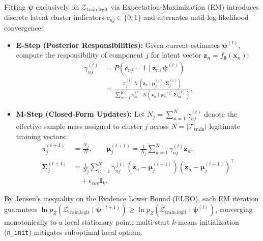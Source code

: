 Fitting $\boldsymbol{\psi}$ exclusively on $\mathcal{Z}_{\text{train,legit}}$ via Expectation-Maximization (EM) \cite{dempster1977maximum} introduces discrete latent cluster indicators $c_{nj} \in \{0,1\}$ and alternates until log-likelihood convergence:
\begin{itemize}
    \item \textbf{E-Step (Posterior Responsibilities):} Given current estimates $\boldsymbol{\psi}^{(t)}$, compute the responsibility of component $j$ for latent vector $\mathbf{z}_n = f_{\boldsymbol{\theta}}(\mathbf{x}_n)$:
    \begin{equation}
        \begin{aligned}\gamma_{nj}^{(t)} &= P(c_{nj}=1 \mid \mathbf{z}_n, \boldsymbol{\psi}^{(t)}) \\
        &= \frac{\pi_j^{(t)} \mathcal{N}(\mathbf{z}_n \mid \boldsymbol{\mu}_j^{(t)}, \boldsymbol{\Sigma}_j^{(t)})}{\sum_{m=1}^K \pi_m^{(t)} \mathcal{N}(\mathbf{z}_n \mid \boldsymbol{\mu}_m^{(t)}, \boldsymbol{\Sigma}_m^{(t)})}.
        \end{aligned}\label{eq:latent_resp}
    \end{equation}
    \item \textbf{M-Step (Closed-Form Updates):} Let $N_j = \sum_{n=1}^{N} \gamma_{nj}^{(t)}$ denote the effective sample mass assigned to cluster $j$ across $N = |\mathcal{T}_{\text{train}}|$ legitimate training vectors:
    \begin{align}
        \pi_j^{(t+1)} &= \frac{N_j}{N}, \qquad
        \boldsymbol{\mu}_j^{(t+1)} = \frac{1}{N_j} \sum_{n=1}^{N} \gamma_{nj}^{(t)} \mathbf{z}_n, \label{eq:latent_m1} \\
        \boldsymbol{\Sigma}_j^{(t+1)} &= \frac{1}{N_j} \sum_{n=1}^{N} \gamma_{nj}^{(t)} (\mathbf{z}_n - \boldsymbol{\mu}_j^{(t+1)})(\mathbf{z}_n - \boldsymbol{\mu}_j^{(t+1)})^\top \nonumber \\
        &\quad + \epsilon_{\text{cov}} \mathbf{I}_k. \label{eq:latent_m2}
    \end{align}
\end{itemize}
By Jensen's inequality on the Evidence Lower Bound (ELBO), each EM iteration guarantees $\ln p_Z(\mathcal{Z}_{\text{train,legit}} \mid \boldsymbol{\psi}^{(t+1)}) \ge \ln p_Z(\mathcal{Z}_{\text{train,legit}} \mid \boldsymbol{\psi}^{(t)})$, converging monotonically to a local stationary point; multi-start $k$-means initialization (\texttt{n\_init}) mitigates suboptimal local optima.

